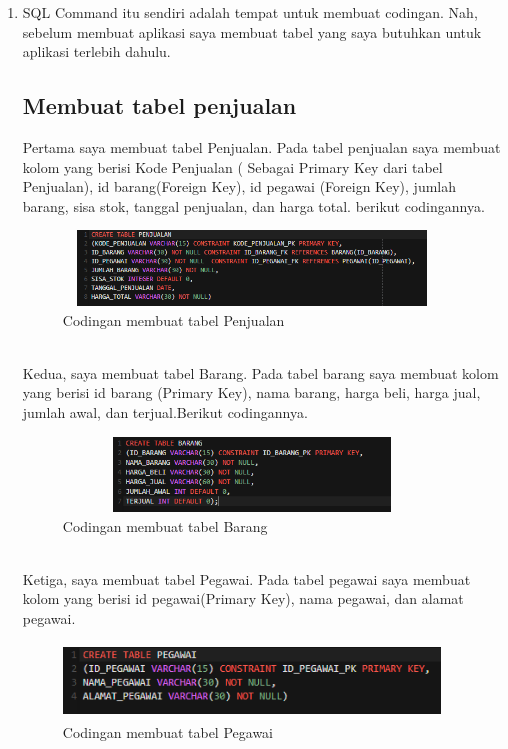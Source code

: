 \documentclass[a4paper, 12pt]{article}
\begin{document}
\begin{enumerate}
\item SQL Command itu sendiri adalah tempat untuk membuat codingan. Nah, sebelum membuat aplikasi saya membuat tabel yang saya butuhkan untuk aplikasi terlebih dahulu.
\subsection{Membuat tabel penjualan}
Pertama saya membuat tabel Penjualan. Pada tabel penjualan saya membuat kolom yang berisi Kode Penjualan ( Sebagai Primary Key dari tabel Penjualan), id barang(Foreign Key), id pegawai (Foreign Key), jumlah barang, sisa stok, tanggal penjualan, dan harga total. berikut codingannya. 

            \begin{figure}[!htbp]
            \centering
            \includegraphics[width=10cm,height=2cm]{gambar/c-1.PNG}
            \caption{Codingan membuat tabel Penjualan}
            \label{penanda}
            \end{figure}\\
            
Kedua, saya membuat tabel Barang. Pada tabel barang saya membuat kolom yang berisi id barang (Primary Key), nama barang, harga beli, harga jual, jumlah awal, dan terjual.Berikut codingannya.

            \begin{figure}[!htbp]
            \centering
            \includegraphics[width=10cm,height=2cm]{gambar/c-2.PNG}
            \caption{Codingan membuat tabel Barang}
            \label{penanda}
            \end{figure}\\

Ketiga, saya membuat tabel Pegawai. Pada tabel pegawai saya membuat kolom yang berisi id pegawai(Primary Key), nama pegawai, dan alamat pegawai.

            \begin{figure}[!htbp]
            \centering
            \includegraphics[width=10cm,height=2cm]{gambar/c-3.PNG}
            \caption{Codingan membuat tabel Pegawai}
            \label{penanda}
            \end{figure}\\
            

\end{enumerate}
\end{document}
